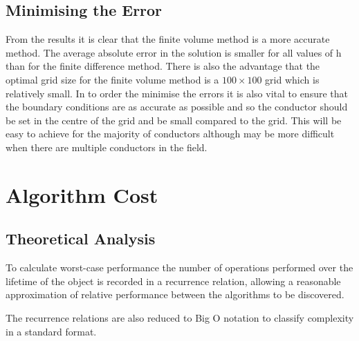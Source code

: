\documentclass[aps,twocolumn,pre,nofootinbib,10pt]{revtex4-1}
\begin{document}
\subsection{Minimising the Error}

From the results it is clear that the finite volume method is a more accurate method. The average absolute error in the solution is smaller for all values of h than for the finite difference method. There is also the advantage that the optimal grid size for the finite volume method is a $100 \times 100$ grid which is relatively small.
In to order the minimise the errors it is also vital to ensure that the boundary conditions are as accurate as possible and so the conductor should be set in the centre of the grid and be small compared to the grid. This will be easy to achieve for the majority of conductors although may be more difficult when there are multiple conductors in the field.

\section{Algorithm Cost}
\subsection{Theoretical Analysis}

To calculate worst-case performance the number of operations performed over the lifetime of the object is recorded in a recurrence relation, allowing a reasonable approximation of relative performance between the algorithms to be discovered.

The recurrence relations are also reduced to Big O notation to classify complexity in a standard format.
\end{document}
